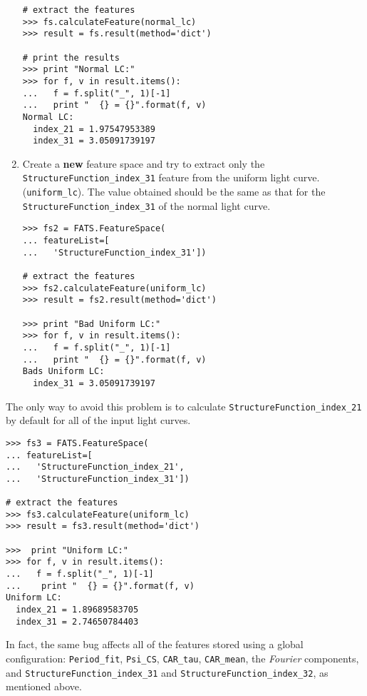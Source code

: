 \documentclass[final,5p,times,twocolumn,authoryear]{elsarticle}
\begin{document}
\begin{description}
\begin{enumerate}
\begin{verbatim}
# extract the features
>>> fs.calculateFeature(normal_lc)
>>> result = fs.result(method='dict')

# print the results
>>> print "Normal LC:"
>>> for f, v in result.items():
...   f = f.split("_", 1)[-1]
...   print "  {} = {}".format(f, v)
Normal LC:
  index_21 = 1.97547953389
  index_31 = 3.05091739197
\end{verbatim}
%
\item Create a \textbf{new} feature space and try to extract only the 
	\texttt{StructureFunction\_index\_31} feature from the uniform light curve.
    (\texttt{uniform\_lc}). The value obtained should be the same as that for the 
	\texttt{StructureFunction\_index\_31} of the normal light curve.

\begin{verbatim}
>>> fs2 = FATS.FeatureSpace(
... featureList=[
...   'StructureFunction_index_31'])

# extract the features
>>> fs2.calculateFeature(uniform_lc)
>>> result = fs2.result(method='dict')

>>> print "Bad Uniform LC:"
>>> for f, v in result.items():
...   f = f.split("_", 1)[-1]
...   print "  {} = {}".format(f, v)
Bads Uniform LC:
  index_31 = 3.05091739197
\end{verbatim}
\end{enumerate}

\item The only way to avoid this problem is to calculate 
	\texttt{StructureFunction\_index\_21} by default for all of the input light curves.

\begin{verbatim}
>>> fs3 = FATS.FeatureSpace(
... featureList=[
...   'StructureFunction_index_21',
...   'StructureFunction_index_31'])

# extract the features
>>> fs3.calculateFeature(uniform_lc)
>>> result = fs3.result(method='dict')

>>>  print "Uniform LC:"
>>> for f, v in result.items():
...   f = f.split("_", 1)[-1]
...    print "  {} = {}".format(f, v)
Uniform LC:
  index_21 = 1.89689583705
  index_31 = 2.74650784403
\end{verbatim}
%

In fact, the same bug affects all of the features stored using a global
configuration: \texttt{Period\_fit}, \texttt{Psi\_CS}, \texttt{CAR\_tau}, \texttt{CAR\_mean}, 
the \textit{Fourier} components, and 
\texttt{StructureFunction\_index\_31} and \texttt{StructureFunction\_index\_32}, as mentioned above.


\end{description}
\end{document}
